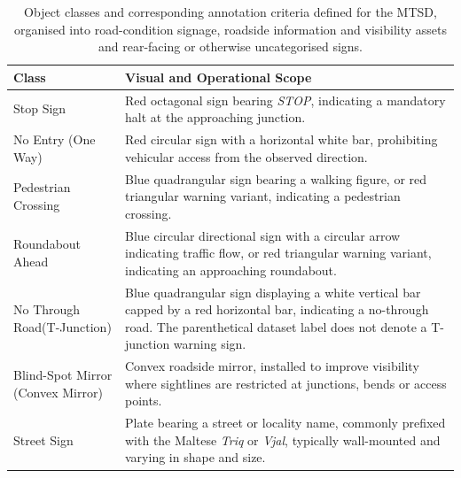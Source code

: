\begin{table}[H]
\centering
\caption{Object classes and corresponding annotation criteria defined for the \gls{MTSD}, organised into road-condition signage, roadside information and visibility assets and rear-facing or otherwise uncategorised signs.}
\label{tab:mtsd-taxonomy}
\begin{tabularx}{\textwidth}{@{}p{3.8cm} X@{}}
\toprule
\textbf{Class} & \textbf{Visual and Operational Scope} \\
\midrule
    Stop Sign
    & Red octagonal sign bearing \emph{STOP}, indicating a mandatory halt at the approaching junction. \\

    \addlinespace[0.5em]
    No Entry (One Way)
    & Red circular sign with a horizontal white bar, prohibiting vehicular access from the observed direction. \\

    \addlinespace[0.5em]

    Pedestrian Crossing
    & Blue quadrangular sign bearing a walking figure, or red triangular warning variant, indicating a pedestrian crossing. \\

    \addlinespace[0.5em]

    Roundabout Ahead
    & Blue circular directional sign with a circular arrow indicating traffic flow, or red triangular warning variant, indicating an approaching roundabout. \\

    \addlinespace[0.5em]

    No Through Road\newline (T-Junction)
    & Blue quadrangular sign displaying a white vertical bar capped by a red horizontal bar, indicating a no-through road. The parenthetical dataset label does not denote a T-junction warning sign. \\

\midrule

    Blind-Spot Mirror (Convex Mirror)
    & Convex roadside mirror, installed to improve visibility where sightlines are restricted at junctions, bends or access points. \\

    \addlinespace[0.5em]

    Street Sign
    & Plate bearing a street or locality name, commonly prefixed with the Maltese \emph{Triq} or \emph{Vjal}, typically wall-mounted and varying in shape and size. \\


\end{tabularx}
\end{table}
